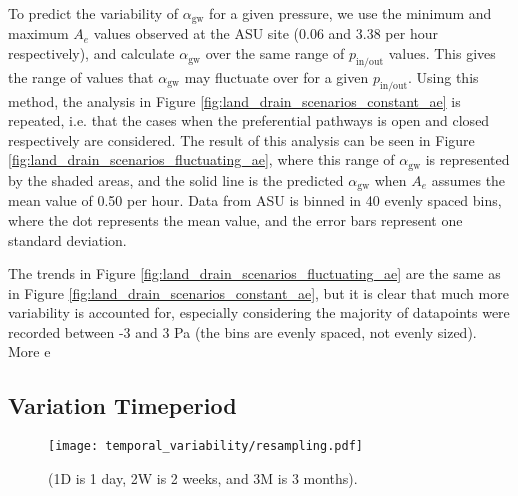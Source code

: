 \documentclass[journal=esthag,manuscript=article]{achemso}
\begin{document}
To predict the variability of $\alpha_\mathrm{gw}$ for a given pressure, we use the minimum and maximum $A_e$ values observed at the ASU site (0.06 and 3.38 per hour respectively), and calculate $\alpha_\mathrm{gw}$ over the same range of $p_\mathrm{in/out}$ values.
This gives the range of values that $\alpha_\mathrm{gw}$ may fluctuate over for a given $p_\mathrm{in/out}$.
Using this method, the analysis in Figure \ref{fig:land_drain_scenarios_constant_ae} is repeated, i.e. that the cases when the preferential pathways is open and closed respectively are considered.
The result of this analysis can be seen in Figure \ref{fig:land_drain_scenarios_fluctuating_ae}, where this range of $\alpha_\mathrm{gw}$ is represented by the shaded areas, and the solid line is the predicted $\alpha_\mathrm{gw}$ when $A_e$ assumes the mean value of 0.50 per hour.
Data from ASU is binned in 40 evenly spaced bins, where the dot represents the mean value, and the error bars represent one standard deviation.

The trends in Figure \ref{fig:land_drain_scenarios_fluctuating_ae} are the same as in Figure \ref{fig:land_drain_scenarios_constant_ae}, but it is clear that much more variability is accounted for, especially considering the majority of datapoints were recorded between -3 and 3 Pa (the bins are evenly spaced, not evenly sized).
More e




\subsection{Variation Timeperiod} %

\begin{figure}[htb!] %
  \centering
  \caption{ (1D is 1 day, 2W is 2 weeks, and 3M is 3 months).}
  \label{fig:resampling}
  \texttt{[image: temporal\_variability/resampling.pdf]}
\end{figure}
\end{document}
